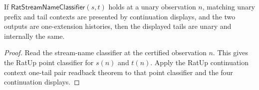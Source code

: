 \begin{theorem}
\label{thm:rat-streamname-classifier-unary-context-e1-pair-readback}
If $\mathsf{RatStreamNameClassifier}(s,t)$ holds at a unary observation $n$,
matching unary prefix and tail contexts are presented by continuation displays,
and the two outputs are one-extension histories, then the displayed tails are
unary and internally the same.
\end{theorem}
\begin{proof}
Read the stream-name classifier at the certified observation $n$. This gives
the RatUp point classifier for $s(n)$ and $t(n)$. Apply the RatUp continuation
context one-tail pair readback theorem to that point classifier and the four
continuation displays.
\end{proof}

